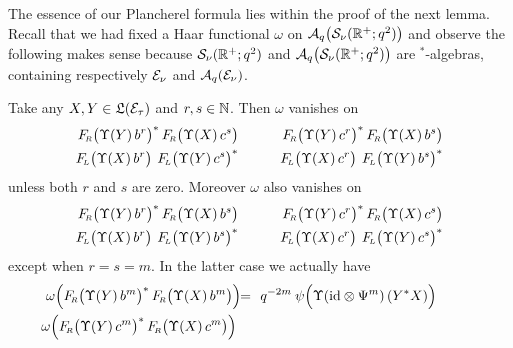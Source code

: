The essence of our Plancherel formula lies within the proof of the next lemma.
Recall that we had fixed a Haar functional $\omega$ on
${\mathcal A}_q\!\left({\mathcal S}_\nu(\mathbb{R}^+;q^2)\right)$ and observe the following makes sense
because ${\mathcal S}_\nu(\mathbb{R}^+;q^2)$ and
$\Aq\!\left({\mathcal S}_\nu(\RR^+;q^2)\vertM \right)$
are $^*$-algebras, containing respectively $\mathcal E_\nu$ and ${\mathcal A}_q(\mathcal E_\nu)$.



\begin{lemma_sec}
Take any\/ $X,Y\in\mathfrak{L}(\mathcal E_\tau)$ and\/ $r, s \in \mathbb{N}$. Then\/ $\omega$ vanishes on
\begin{eqnarray*}
   \FRabb\!\left(\Upsilon(Y)\, b^r \vertM\right)^*
   \FRabb\!\left(\Upsilon(X)\, c^s \vertM\right)
& \hspace{2em}  &
   \FRabb\!\left(\Upsilon(Y)\, c^r \vertM\right)^*
   \FRabb\!\left(\Upsilon(X)\, b^s \vertM\right)
\\
   \FLabb\! \left(\Upsilon(X)\, b^r \vertM\right) \:
   \FLabb\! \left(\Upsilon(Y)\, c^s \vertM\right)^*
& &
   \FLabb\! \left(\Upsilon(X)\, c^r \vertM\right) \:
   \FLabb\! \left(\Upsilon(Y)\, b^s \vertM\right)^*
\end{eqnarray*}
unless both $r$ and $s$ are zero. Moreover $\omega$ also vanishes on
\begin{eqnarray*}
   \FRabb\!\left(\Upsilon(Y)\, b^r \vertM\right)^*
   \FRabb\!\left(\Upsilon(X)\, b^s \vertM\right)
& \hspace{2em}  &
   \FRabb\!\left(\Upsilon(Y)\, c^r \vertM\right)^*
   \FRabb\!\left(\Upsilon(X)\, c^s \vertM\right)
\\
   \FLabb\! \left(\Upsilon(X)\, b^r \vertM\right) \:
   \FLabb\! \left(\Upsilon(Y)\, b^s \vertM\right)^*
&&
   \FLabb\! \left(\Upsilon(X)\, c^r \vertM\right) \:
   \FLabb\! \left(\Upsilon(Y)\, c^s \vertM\right)^*
\end{eqnarray*}
except when\/ $r=s=m$. In the latter case we actually have
\begin{eqnarray}
   \omega\! \left(\vertL  \FRabb\!\left(\Upsilon(Y)\, b^m \vertM\right)^*
                          \FRabb\!\left(\Upsilon(X)\, b^m \vertM\right)   \right)
\!\!&=&\!\!
   q^{-2m} \: \psi \! \left(\Upsilon \!\left(\id \tens \Psi^m \right)(Y^* X) \vertL\right)
\hspace{3em}
\label{eq:pre_plancherel:essence:Rb}
\\
    \omega\! \left(\vertL  \FRabb\!\left(\Upsilon(Y)\, c^m \vertM\right)^*
                          \FRabb\!\left(\Upsilon(X)\, c^m \vertM\right)   \right)

\end{eqnarray}
\end{lemma_sec}
